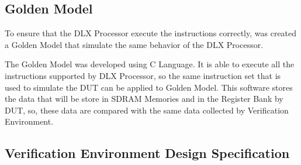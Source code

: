 \documentclass{article}
\begin{document}
	\subsection{Golden Model}
	To ensure that the DLX Processor execute the instructions correctly, was created a Golden Model that simulate the same behavior of the DLX Processor.
	
	The Golden Model was developed using C Language. It is able to execute all the instructions supported by DLX Processor, so the same instruction set that is used to simulate the DUT can be applied to Golden Model. This software stores the data that will be store in SDRAM Memories and in the Register Bank by DUT, so, these data are compared with the same data collected by Verification Environment.

	
	\subsection{Verification Environment Design Specification}
  \FloatBarrier
\end{document}
